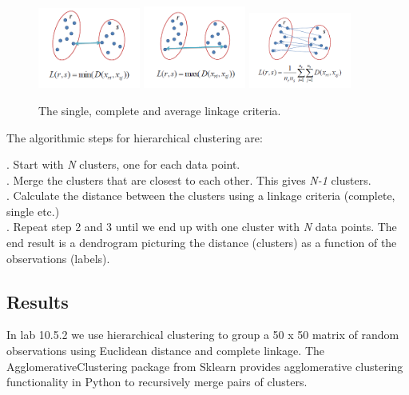 \begin{figure}[H]
	\centering
	\includegraphics[width=0.3\textwidth]{clusteringMethods/hierarchicalclustering/fig/ClusteringSingle.png}
	\includegraphics[width=0.3\textwidth]{clusteringMethods/hierarchicalclustering/fig/ClusteringComplete.png}
	\includegraphics[width=0.3\textwidth]{clusteringMethods/hierarchicalclustering/fig/ClusteringAverage.png}
	\caption{The single,  complete and average linkage criteria.}
	\label{fig:linkagecriteria}
\end{figure}

\noindent The algorithmic steps for hierarchical clustering are:

. Start with \textit{N} clusters, one for each data point. \\
. Merge the clusters that are closest to each other. This gives \textit{N-1} clusters. \\
. Calculate the distance between the clusters using a linkage criteria (complete, single etc.) \\
. Repeat step 2 and 3 until we end up with one cluster with \textit{N} data points. The end result is a dendrogram picturing the distance (clusters) as a function of the observations (labels).

\subsection{Results}

In lab 10.5.2 we use hierarchical clustering to group a 50 x 50 matrix of random observations using Euclidean distance and complete linkage. The AgglomerativeClustering package from Sklearn provides agglomerative clustering functionality in Python to recursively  merge pairs of clusters.

